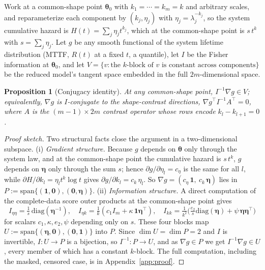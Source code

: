 \documentclass[11pt]{article}
\renewcommand{\v}[1]{\boldsymbol{#1}}
\newtheorem{proposition}{Proposition}[section]
\begin{document}
Work at a common-shape point $\v\theta_0$ with $k_1=\cdots=k_m=k$ and arbitrary scales, and reparameterize each component by $(k_j, \eta_j)$ with $\eta_j = \lambda_j^{-k_j}$, so the system cumulative hazard is $H(t) = \sum_j \eta_j t^{k_j}$, which at the common-shape point is $s\,t^k$ with $s = \sum_j \eta_j$. Let $g$ be any smooth functional of the system lifetime distribution (MTTF, $R(t)$ at a fixed $t$, a quantile), let $I$ be the Fisher information at $\v\theta_0$, and let $V = \{v : \text{the } k\text{-block of } v \text{ is constant across components}\}$ be the reduced model's tangent space embedded in the full $2m$-dimensional space.

\begin{proposition}[Conjugacy identity]
\label{prop:conjugacy}
At any common-shape point, $I^{-1}\nabla g \in V$; equivalently, $\nabla g$ is $I$-conjugate to the shape-contrast directions, $\nabla g^\top I^{-1} A^\top = 0$, where $A$ is the $(m-1)\times 2m$ contrast operator whose rows encode $k_l - k_{l+1} = 0$.
\end{proposition}

\begin{proof}[Proof sketch]
Two structural facts close the argument in a two-dimensional subspace. (i) \emph{Gradient structure.} Because $g$ depends on $\v\theta$ only through the system law, and at the common-shape point the cumulative hazard is $s\,t^k$, $g$ depends on $\v\eta$ only through the sum $s$; hence $\partial g/\partial \eta_l = c_\eta$ is the same for all $l$, while $\partial H/\partial k_l = \eta_l t^k\log t$ gives $\partial g/\partial k_l = c_k\,\eta_l$. So $\nabla g = (c_\eta\,\v 1,\ c_k\,\v\eta)$ lies in $P := \mathrm{span}\{(\v 1, \v 0), (\v 0, \v\eta)\}$. (ii) \emph{Information structure.} A direct computation of the complete-data score outer products at the common-shape point gives
\[
I_{\eta\eta} = \tfrac1s\,\mathrm{diag}(\v\eta^{-1}),\quad
I_{\eta k} = \tfrac1k(c_1 I_m + \kappa\,\v 1\v\eta^\top),\quad
I_{kk} = \tfrac1{k^2}\bigl(\tfrac{e_2}{s}\mathrm{diag}(\v\eta) + \psi\,\v\eta\v\eta^\top\bigr)
\]
for scalars $c_1,\kappa,e_2,\psi$ depending only on $s$. These four blocks map $U := \mathrm{span}\{(\v\eta, \v 0), (\v 0, \v 1)\}$ into $P$. Since $\dim U = \dim P = 2$ and $I$ is invertible, $I: U \to P$ is a bijection, so $I^{-1}: P \to U$, and as $\nabla g \in P$ we get $I^{-1}\nabla g \in U$, every member of which has a constant $k$-block. The full computation, including the masked, censored case, is in Appendix~\ref{app:proof}.
\end{proof}
\end{document}
